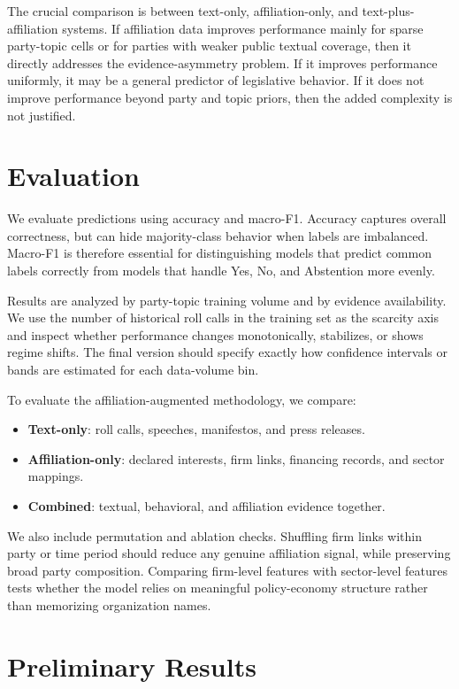 \documentclass[letterpaper]{article}
\begin{document}
The crucial comparison is between text-only, affiliation-only, and text-plus-affiliation systems. If affiliation data improves performance mainly for sparse party-topic cells or for parties with weaker public textual coverage, then it directly addresses the evidence-asymmetry problem. If it improves performance uniformly, it may be a general predictor of legislative behavior. If it does not improve performance beyond party and topic priors, then the added complexity is not justified.

\section{Evaluation}

We evaluate predictions using accuracy and macro-F1. Accuracy captures overall correctness, but can hide majority-class behavior when labels are imbalanced. Macro-F1 is therefore essential for distinguishing models that predict common labels correctly from models that handle Yes, No, and Abstention more evenly.

Results are analyzed by party-topic training volume and by evidence availability. We use the number of historical roll calls in the training set as the scarcity axis and inspect whether performance changes monotonically, stabilizes, or shows regime shifts. The final version should specify exactly how confidence intervals or bands are estimated for each data-volume bin.

To evaluate the affiliation-augmented methodology, we compare:
\begin{itemize}
    \item \textbf{Text-only}: roll calls, speeches, manifestos, and press releases.
    \item \textbf{Affiliation-only}: declared interests, firm links, financing records, and sector mappings.
    \item \textbf{Combined}: textual, behavioral, and affiliation evidence together.
\end{itemize}

We also include permutation and ablation checks. Shuffling firm links within party or time period should reduce any genuine affiliation signal, while preserving broad party composition. Comparing firm-level features with sector-level features tests whether the model relies on meaningful policy-economy structure rather than memorizing organization names.

\section{Preliminary Results}
\end{document}
